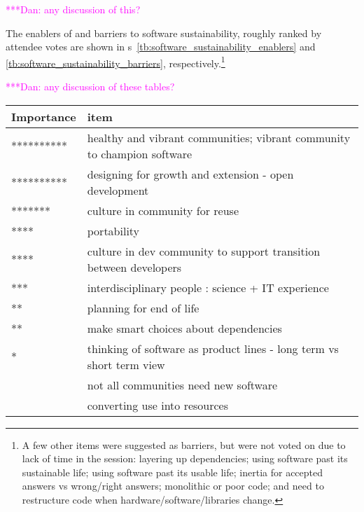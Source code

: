 \documentclass[11pt, oneside]{amsart}
\newcommand{\katznote}[1]{ {\textcolor{magenta}    { ***Dan:      #1 }}}
\begin{document}
\katznote{any discussion of this?}

The enablers of and barriers to software sustainability, roughly ranked by
attendee votes are shown in
{\tablename}s~\ref{tb:software_sustainability_enablers} and
\ref{tb:software_sustainability_barriers}, respectively.\footnote{A few other
items were suggested as barriers, but were not voted on due to lack of time in
the session:
layering up dependencies;
using software past its sustainable life;
using software past its usable life;
inertia for accepted answers vs wrong/right answers;
monolithic or poor code; and
need to restructure code when hardware/software/libraries change.
}

\katznote{any discussion of these tables?}

\begin{table*}[ht]
\begin{center}
\caption{Enablers of software sustainability, with 0 to 10 `*'s roughly
indicating the fraction of attendees who voted for an item as important}
    \begin{scriptsize}
    \begin{tabular}{ | p{1.65cm} | p{10.0cm} |}
    \hline
  Importance & item \\ \hline \hline
********** & healthy and vibrant communities; vibrant community to champion software \\ \hline
********** & designing for growth and extension - open development \\ \hline
******* & culture in community for reuse \\ \hline
**** & portability \\ \hline
**** & culture in dev community to support transition between developers \\ \hline
*** & interdisciplinary people : science + IT experience \\ \hline
** & planning for end of life \\ \hline
** & make smart choices about dependencies \\ \hline
* & thinking of software as product lines - long term vs short term view \\ \hline
 & not all communities need new software \\ \hline
 & converting use into resources \\ \hline
    \end{tabular}
    \end{scriptsize}
    \label{tb:software_sustainability_enablers}
\end{center}   
\end{table*} 
\end{document}
